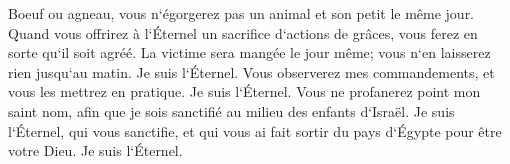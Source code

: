 \verse Boeuf ou agneau, vous n`égorgerez pas un animal et son petit le même jour. 
\verse Quand vous offrirez à l`Éternel un sacrifice d`actions de grâces, vous ferez en sorte qu`il soit agréé. 
\verse La victime sera mangée le jour même; vous n`en laisserez rien jusqu`au matin. Je suis l`Éternel. 
\verse Vous observerez mes commandements, et vous les mettrez en pratique. Je suis l`Éternel. 
\verse Vous ne profanerez point mon saint nom, afin que je sois sanctifié au milieu des enfants d`Israël. Je suis l`Éternel, qui vous sanctifie, 
\verse et qui vous ai fait sortir du pays d`Égypte pour être votre Dieu. Je suis l`Éternel. 

